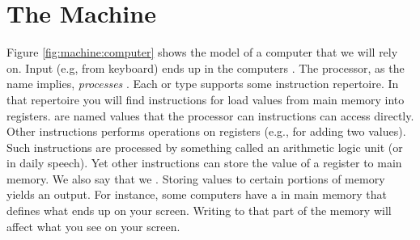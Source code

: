 \section{The Machine}
\label{sec:machine}









Figure \ref{fig:machine:computer} shows the model of a computer that we will rely on. Input (e.g, from keyboard) ends up in the computers . The processor, as the name implies, \textsl{processes} . Each  or type supports some instruction repertoire. In that repertoire you will find instructions for load values from main memory into registers.  are named values that the processor can instructions can access directly. Other instructions performs operations on registers (e.g., for adding two values). Such instructions are processed by something called an arithmetic logic unit (or  in daily speech). Yet other instructions can store the value of a register to main memory. We also say that we . Storing values to certain portions of memory yields an output. For instance, some computers have a  in main memory that defines what ends up on your screen. Writing to that part of the memory will affect what you see on your screen.

